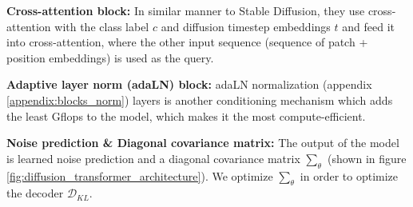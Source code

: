 \textbf{Cross-attention block:} In similar manner to Stable Diffusion, they use cross-attention with the class label $c$ and diffusion timestep embeddings $t$ and feed it into cross-attention, where the other input sequence (sequence of patch + position embeddings) is used as the query.

\textbf{Adaptive layer norm (adaLN) block:} adaLN normalization (appendix \ref{appendix:blocks_norm}) layers is another conditioning mechanism which adds the least Gflops to the model, which makes it the most compute-efficient.

\textbf{Noise prediction \& Diagonal covariance matrix:} The output of the model is learned noise prediction and a diagonal covariance matrix $\sum_\theta$ (shown in figure \ref{fig:diffusion_transformer_architecture}). We optimize $\sum_\theta$ in order to optimize the decoder $\mathcal{D}_{KL}$.

